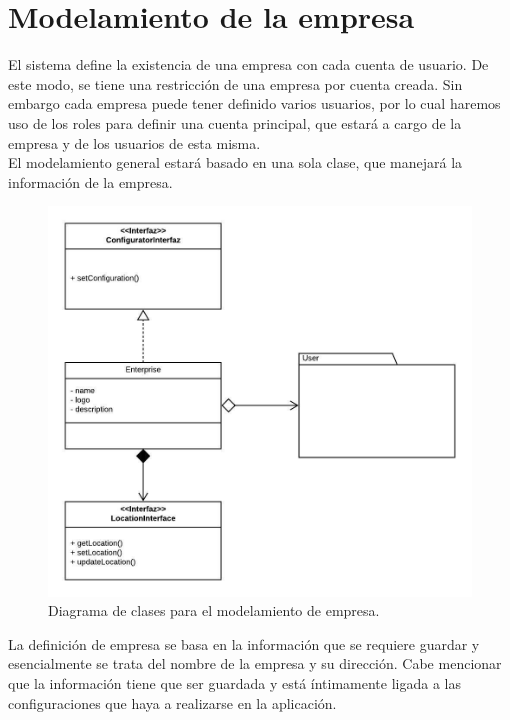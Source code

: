 \section{Modelamiento de la empresa}

El sistema define la existencia de una empresa con cada cuenta de usuario. De este modo, se tiene una restricción de una empresa por cuenta creada. Sin embargo cada empresa puede tener definido varios usuarios, por lo cual haremos uso de los roles para definir una cuenta principal, que estará a cargo de la empresa y de los usuarios de esta misma.\\

El modelamiento general estará basado en una sola clase, que manejará la información de la empresa.\\

\begin{figure}
  \centering
    \includegraphics[scale=0.9]{./Capitulo3/figs/ADDStock-enterprise.jpeg}
  \caption{Diagrama de clases para el modelamiento de empresa.}
  \label{enterprise}
\end{figure}

La definición de empresa se basa en la información que se requiere guardar y esencialmente se trata del nombre de la empresa y su dirección. Cabe mencionar que la información tiene que ser guardada y está íntimamente ligada a las configuraciones que haya a realizarse en la aplicación.\\

